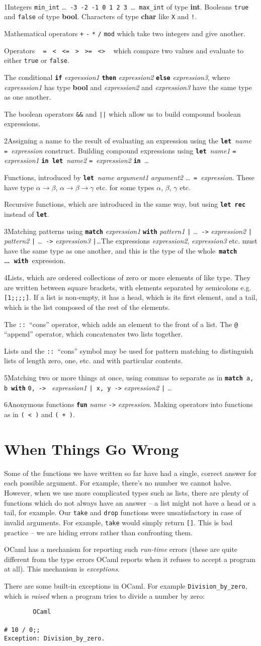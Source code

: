 \documentclass[]{book}
\makeatletter
\newcommand\upquote[1]{\textquotesingle#1\textquotesingle}
\newcommand{\sofarstartingoff}{

\noindent \lettrine[loversize=0.1,nindent=0em]{1}{}Integers \texttt{min\_int} \ldots\ \texttt{-3}\ \texttt{-2}\ \texttt{-1}\ \texttt{0}\ \texttt{1}\ \texttt{2}\ \texttt{3}\ \ldots\ \texttt{max\_int} of type \textbf{\textsf{int}}. Booleans \texttt{true} and \texttt{false} of type \textbf{\textsf{bool}}. \noindent Characters of type \textsf{\textbf{char}} like \texttt{\upquote{X}} and \texttt{\upquote{!}}.
\vspace{2mm}

\noindent Mathematical operators \texttt{+} \texttt{-} \texttt{*} \texttt{/} \texttt{mod} which take two integers and give another.

\vspace{2mm}

\noindent Operators \ \!\! \texttt{=\ \!\!} \texttt{<\ \!\!} \texttt{<=\ \!\!} \texttt{>\ \!\!} \texttt{>=\ \!\!} \texttt{<>} \ \!\! which compare two values and evaluate to either \texttt{true} or \texttt{false}.

\vspace{2mm}

\noindent The conditional \textbf{\texttt{if}} \textit{expression1} \textbf{\texttt{then}} \textit{expression2} \textbf{\texttt{else}} \textit{expression3}, where \textit{expresssion1} has type \textsf{\textbf{bool}} and \textit{expression2} and \textit{expression3} have the same type as one another.

\vspace{2mm}

\noindent The boolean operators \texttt{\&\&} and \texttt{||} which allow us to build compound boolean expressions.}
\newcommand{\sofarfunctions}
{
\noindent\lettrine[loversize=0.1,findent=2pt,nindent=0em]{2}{}Assigning a name to the result of evaluating an expression using the \textbf{\texttt{let}}\ \textit{name} \texttt{=}\ \textit{expression} construct. Building compound expressions using \textbf{\texttt{let}}\ \textit{name1} \texttt{=} \textit{expression1} \textbf{\texttt{in}}\ \textbf{\texttt{let}}\ \textit{name2} \texttt{=}\ \textit{expression2} \textbf{\texttt{in}}\ \ldots

\vspace{2mm} 

\noindent Functions, introduced by \textbf{\texttt{let}}\ \textit{name} \textit{argument1} \textit{argument2} \ldots\ \texttt{=}\ \textit{expression}. These have type $\alpha \rightarrow \beta$, $\alpha \rightarrow \beta \rightarrow \gamma$ etc. for some types $\alpha$, $\beta$, $\gamma$ etc.

\vspace{2mm}

\noindent Recursive functions, which are introduced in the same way, but using \textbf{\texttt{let\!\! rec}} instead of \textbf{\texttt{let}}.}
\newcommand{\sofarcasebycase}
{\noindent \lettrine[loversize=0.1,findent=2pt,nindent=0em]{3}{}Matching patterns using \textbf{\texttt{match}} \textit{expression1} \textbf{\texttt{with}} \textit{pattern1} \texttt{|} \ldots\ \texttt{->} \textit{expression2} \texttt{|} \textit{pattern2} \texttt{|} \ldots\ \texttt{->} \textit{expression3} \texttt{|}\ldots The expressions \textit{expression2}, \textit{expression3} etc. must have the same type as one another, and this is the type of the whole \,\textbf{\texttt{match} \ldots\ \texttt{with}}\, expression.}
\newcommand{\sofarlistingthings}
{
\noindent \lettrine[loversize=0.1,findent=2pt,nindent=0em]{4}{}Lists, which are ordered collections of zero or more elements of like type. They are written between square brackets, with elements separated by semicolons e.g. \texttt{[1;\! 2;\! 3;\! 4;\! 5]}. If a list is non-empty, it has a head, which is its first element, and a tail, which is the list composed of the rest of the elements.

\vspace{2mm}

\noindent The \texttt{::}\ ``cons'' operator, which adds an element to the front of a list. The \texttt{@} ``append'' operator, which concatenates two lists together.

\vspace{2mm}

\noindent Lists and the \texttt{::}\ ``cons'' symbol may be used for pattern matching to distinguish lists of length zero, one, etc. and with particular contents.}
\newcommand{\sofarsortingthings}
{
\noindent \lettrine[loversize=0.1,findent=2pt,nindent=0em]{5}{}Matching two or more things at once, using commas to separate as in \texttt{\textbf{match}}\, \texttt{a,\!\! b}\, \textbf{\texttt{with}} \texttt{0,\!\! 0\! ->\! }\! \textit{expression1} \texttt{|\ \!x,\!\! y\! ->} \textit{expression2} \texttt{|} \ldots
}
\newcommand{\sofarfunctionsuponfunctions}
{
\noindent \lettrine[loversize=0.1,findent=2pt,nindent=0em]{6}{}Anonymous functions \textbf{\texttt{fun}} \textit{name} \texttt{->} \textit{expression}. Making operators into functions as in \texttt{(\! <\! )} and \texttt{(\! +\! )}.
}
\newcommand{\smspace}{\vspace{4mm}}
\makeatother
\begin{document}
\cleardoublepage
\thispagestyle{empty}
\\

\begin{multicols*}{2}
\footnotesize
\sofarstartingoff

\vspace{\baselineskip}
\sofarfunctions

\vspace{\baselineskip}
\sofarcasebycase

\vspace{\baselineskip}
\sofarlistingthings

\vspace{\baselineskip}
\sofarsortingthings

\vspace{\baselineskip}
\sofarfunctionsuponfunctions

\end{multicols*}

\pagestyle{empty}

\chapter{When Things Go Wrong}
\pagestyle{fancy}
\label{whenthingsgowrong}

Some of the functions we have written so far have had a single, correct answer for each possible argument. For example, there's no number we cannot halve. However, when we use more complicated types such as lists, there are plenty of functions which do not always have an answer -- a list might not have a head or a tail, for example. Our \texttt{take} and \texttt{drop} functions were unsatisfactory in case of invalid arguments. For example, \texttt{take\! [\upquote{a}]} would simply return \texttt{[]}. This is bad practice -- we are hiding errors rather than confronting them.

OCaml has a mechanism for reporting such \textit{run-time} errors (these are quite different from the type errors OCaml reports when it refuses to accept a program at all). This mechanism is \textit{exceptions}.

There are some built-in exceptions in OCaml. For example \texttt{Division\_by\_zero}, which is \textit{raised} when a program tries to divide a number by zero:

\smspace
\noindent\verb!        OCaml!\\
\noindent\\
\noindent\verb!# 10 / 0;;!\\
\noindent\verb!Exception: Division_by_zero.!
\smspace
\end{document}
